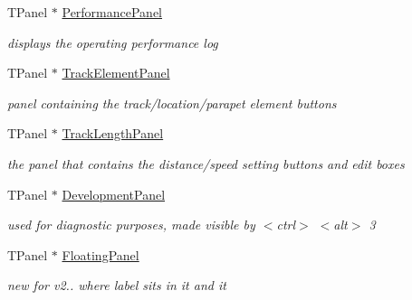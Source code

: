 \begin{DoxyCompactItemize}
\mbox{\label{class_t_interface_a4801769eef6bace140a5fddc5edf58e6}} 
T\+Panel $\ast$ \mbox{\hyperlink{class_t_interface_a4801769eef6bace140a5fddc5edf58e6}{Performance\+Panel}}
\begin{DoxyCompactList}\small\item\em displays the operating performance log \end{DoxyCompactList}\item 
\mbox{\label{class_t_interface_a94de13b77e51b4894755d1564d812cda}} 
T\+Panel $\ast$ \mbox{\hyperlink{class_t_interface_a94de13b77e51b4894755d1564d812cda}{Track\+Element\+Panel}}
\begin{DoxyCompactList}\small\item\em panel containing the track/location/parapet element buttons \end{DoxyCompactList}\item 
\mbox{\label{class_t_interface_abc8305e8654aeac73f905b3fa8f9eb7b}} 
T\+Panel $\ast$ \mbox{\hyperlink{class_t_interface_abc8305e8654aeac73f905b3fa8f9eb7b}{Track\+Length\+Panel}}
\begin{DoxyCompactList}\small\item\em the panel that contains the distance/speed setting buttons and edit boxes \end{DoxyCompactList}\item 
\mbox{\label{class_t_interface_a82ceb0b38e171d2b46c19f76afef35c1}} 
T\+Panel $\ast$ \mbox{\hyperlink{class_t_interface_a82ceb0b38e171d2b46c19f76afef35c1}{Development\+Panel}}
\begin{DoxyCompactList}\small\item\em used for diagnostic purposes, made visible by $<$ctrl$>$ $<$alt$>$ \textquotesingle{}3\textquotesingle{} \end{DoxyCompactList}\item 
\mbox{\label{class_t_interface_a424f4da4b4f2795f36ac40c8dc2a9a10}} 
T\+Panel $\ast$ \mbox{\hyperlink{class_t_interface_a424f4da4b4f2795f36ac40c8dc2a9a10}{Floating\+Panel}}
\begin{DoxyCompactList}\small\item\em new for v2.. where label sits in it and it \end{DoxyCompactList}\item 

\end{DoxyCompactItemize}
